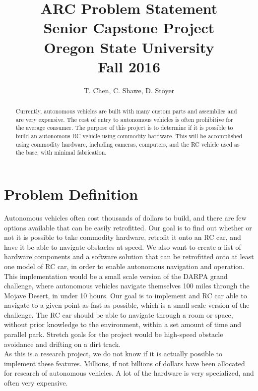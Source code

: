 \documentclass[draftclsnofoot,onecolumn,10pt]{IEEEtran}
\begin{document}
\begin{titlepage}
\title{
ARC Problem Statement\\
\LARGE
Senior Capstone Project\\
Oregon State University\\
Fall 2016
}

\author{T. Chen, C. Shawe, D. Stoyer}
\maketitle

\begin{abstract}
Currently, autonomous vehicles are built with many custom parts and assemblies
and are very expensive. The cost of entry to autonomous vehicles is often
prohibitive for the average consumer. The purpose of this project is to determine
if it is possible to build an autonomous RC vehicle using commodity hardware.
This will be accomplished using commodity hardware, including cameras, computers,
and the RC vehicle used as the base, with minimal fabrication.
\end{abstract}

\thispagestyle{empty} %

\end{titlepage}


\newpage

\section{Problem Definition}
Autonomous vehicles often cost thousands of dollars to build, and there are few
options available that can be easily retrofitted. Our goal is to find out whether
or not it is possible to take commodity hardware, retrofit it onto an RC car, and
have it be able to navigate obstacles at speed. We also want to create a list of
hardware components and a software solution that can be retrofitted onto at least
one model of RC car, in order to enable autonomous navigation and operation.\\
This implementation would be a small scale version of the DARPA grand challenge,
where autonomous vehicles navigate themselves 100 miles through the Mojave Desert,
in under 10 hours. Our goal is to implement and RC car able to navigate to a given
point as fast as possible, which is a small scale version of the challenge. The RC
car should be able to navigate through a room or space, without prior knowledge to
the environment, within a set amount of time and parallel park. Stretch goals for
the project would be high-speed obstacle avoidance and drifting on a dirt track.\\
As this is a research project, we do not know if it is actually possible to implement 
these features. Millions, if not billions of dollars have been allocated for
research of autonomous vehicles. A lot of the hardware is very specialized, and
often very expensive.
\end{document}

